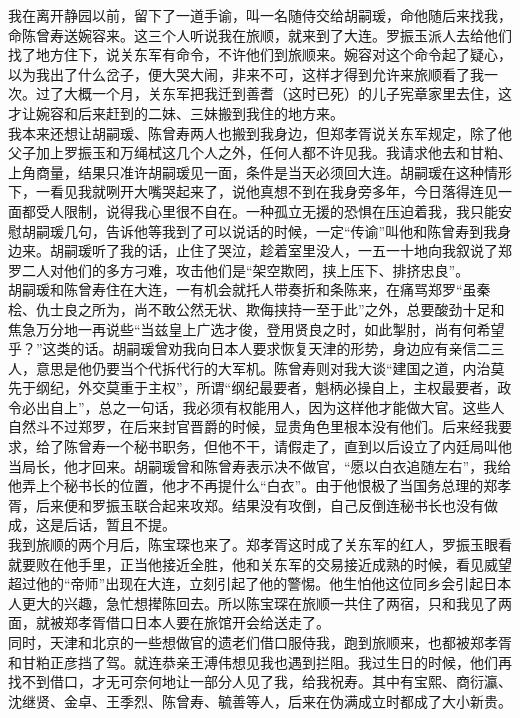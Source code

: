 我在离开静园以前，留下了一道手谕，叫一名随侍交给胡嗣瑗，命他随后来找我，命陈曾寿送婉容来。这三个人听说我在旅顺，就来到了大连。罗振玉派人去给他们找了地方住下，说关东军有命令，不许他们到旅顺来。婉容对这个命令起了疑心，以为我出了什么岔子，便大哭大闹，非来不可，这样才得到允许来旅顺看了我一次。过了大概一个月，关东军把我迁到善耆（这时已死）的儿子宪章家里去住，这才让婉容和后来赶到的二妹、三妹搬到我住的地方来。\\

我本来还想让胡嗣瑗、陈曾寿两人也搬到我身边，但郑孝胥说关东军规定，除了他父子加上罗振玉和万绳栻这几个人之外，任何人都不许见我。我请求他去和甘粕、上角商量，结果只准许胡嗣瑗见一面，条件是当天必须回大连。胡嗣瑗在这种情形下，一看见我就咧开大嘴哭起来了，说他真想不到在我身旁多年，今日落得连见一面都受人限制，说得我心里很不自在。一种孤立无援的恐惧在压迫着我，我只能安慰胡嗣瑗几句，告诉他等我到了可以说话的时候，一定“传谕”叫他和陈曾寿到我身边来。胡嗣瑗听了我的话，止住了哭泣，趁着室里没人，一五一十地向我叙说了郑罗二人对他们的多方刁难，攻击他们是“架空欺罔，挟上压下、排挤忠良”。\\

胡嗣瑗和陈曾寿住在大连，一有机会就托人带奏折和条陈来，在痛骂郑罗“虽秦桧、仇士良之所为，尚不敢公然无状、欺侮挟持一至于此”之外，总要酸劲十足和焦急万分地一再说些“当兹皇上广选才俊，登用贤良之时，如此掣肘，尚有何希望乎？”这类的话。胡嗣瑗曾劝我向日本人要求恢复天津的形势，身边应有亲信二三人，意思是他仍要当个代拆代行的大军机。陈曾寿则对我大谈“建国之道，内治莫先于纲纪，外交莫重于主权”，所谓“纲纪最要者，魁柄必操自上，主权最要者，政令必出自上”，总之一句话，我必须有权能用人，因为这样他才能做大官。这些人自然斗不过郑罗，在后来封官晋爵的时候，显贵角色里根本没有他们。后来经我要求，给了陈曾寿一个秘书职务，但他不干，请假走了，直到以后设立了内廷局叫他当局长，他才回来。胡嗣瑗曾和陈曾寿表示决不做官，“愿以白衣追随左右”，我给他弄上个秘书长的位置，他才不再提什么“白衣”。由于他恨极了当国务总理的郑孝胥，后来便和罗振玉联合起来攻郑。结果没有攻倒，自己反倒连秘书长也没有做成，这是后话，暂且不提。\\

我到旅顺的两个月后，陈宝琛也来了。郑孝胥这时成了关东军的红人，罗振玉眼看就要败在他手里，正当他接近全胜，他和关东军的交易接近成熟的时候，看见威望超过他的“帝师”出现在大连，立刻引起了他的警惕。他生怕他这位同乡会引起日本人更大的兴趣，急忙想撵陈回去。所以陈宝琛在旅顺一共住了两宿，只和我见了两面，就被郑孝胥借口日本人要在旅馆开会给送走了。\\

同时，天津和北京的一些想做官的遗老们借口服侍我，跑到旅顺来，也都被郑孝胥和甘粕正彦挡了驾。就连恭亲王溥伟想见我也遇到拦阻。我过生日的时候，他们再找不到借口，才无可奈何地让一部分人见了我，给我祝寿。其中有宝熙、商衍瀛、沈继贤、金卓、王季烈、陈曾寿、毓善等人，后来在伪满成立时都成了大小新贵。\\

